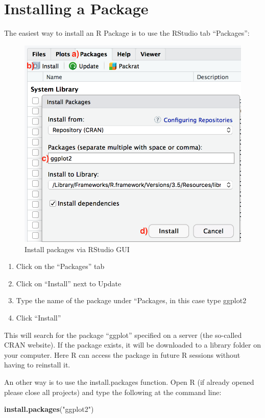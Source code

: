 \documentclass[
  a4paperpaper,
]{book}
\newenvironment{Shaded}{\begin{snugshade}}{\end{snugshade}}
\newcommand{\KeywordTok}[1]{\textcolor[rgb]{0.13,0.29,0.53}{\textbf{#1}}}
\newcommand{\NormalTok}[1]{#1}
\newcommand{\StringTok}[1]{\textcolor[rgb]{0.31,0.60,0.02}{#1}}
\let\oldShaded\Shaded
\let\endoldShaded\endShaded
\renewenvironment{Shaded}{\footnotesize\oldShaded}{\endoldShaded}
\begin{document}
\newpage

\hypertarget{installing-a-package}{%
\section{Installing a Package}\label{installing-a-package}}

The easiest way to install an R Package is to use the RStudio tab ``Packages'':

\begin{figure}
\includegraphics[width=0.5\linewidth]{images/a2-installPackagesRStudio} \caption{Install packages via RStudio GUI}\label{fig:knitr-logo}
\end{figure}

\begin{enumerate}
\def\labelenumi{\alph{enumi})}
\item
  Click on the ``Packages'' tab
\item
  Click on ``Install'' next to Update
\item
  Type the name of the package under ``Packages, in this case type ggplot2
\item
  Click ``Install''
\end{enumerate}

This will search for the package ``ggplot'' specified on a server (the so-called CRAN website). If the package exists, it will be downloaded to a library folder on your computer. Here R can access the package in future R sessions without having to reinstall it.

An other way is to use the install.packages function.
Open R (if already opened please close all projects) and type the following at the command line:

\begin{Shaded}
\begin{Highlighting}[]
\KeywordTok{install.packages}\NormalTok{(}\StringTok{"ggplot2"}\NormalTok{)}
\end{Highlighting}
\end{Shaded}
\end{document}
